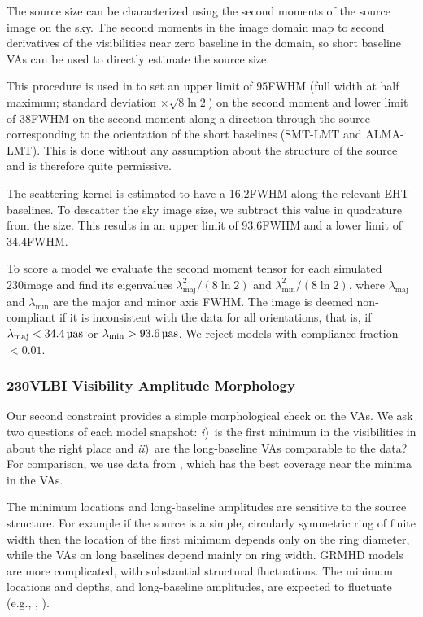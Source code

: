 The source size can be characterized using the second moments of the
source image on the sky.
The second moments in the image domain map to second derivatives of
the visibilities near zero baseline in the \uv domain, so short
baseline VAs can be used to directly estimate the source size.

This procedure is used in  to set an upper limit
of 95\uas FWHM (full width at half maximum; standard deviation
$\times \sqrt{8\ln{2}}$) on the second moment and lower limit of
38\uas FWHM on the second moment along a direction
through the source corresponding to the orientation of the short
baselines (SMT-LMT and ALMA-LMT).
This is done without any assumption about the structure of the source
and is therefore quite permissive.

The scattering kernel is estimated to have a 16.2\uas FWHM along the
relevant EHT baselines.
To descatter the sky image size, we subtract this value in quadrature
from the size.
This results in an upper limit of 93.6\uas FWHM and a lower limit of
34.4\uas FWHM.

To score a model we evaluate the second moment tensor for each
simulated 230\GHz image and find its eigenvalues
$\lambda_\mathrm{maj}^2/(8\ln 2)$ and $\lambda_\mathrm{min}^2/(8\ln
2)$, where $\lambda_\mathrm{maj}$ and $\lambda_\mathrm{min}$ are the
major and minor axis FWHM.
The image is deemed non-compliant if it is inconsistent with the data
for all orientations, that is, if $\lambda_\mathrm{maj} < 34.4\uas$ or
$\lambda_\mathrm{min} > 93.6\uas$.
We reject models with compliance fraction $< 0.01$.

\subsubsection{230\GHz VLBI Visibility Amplitude Morphology}

Our second constraint provides a simple morphological check on the
VAs.
We ask two questions of each model snapshot:
\emph{i})~is the first minimum in the visibilities in about the right
place and
\emph{ii})~are the long-baseline VAs comparable to the data?
For comparison, we use data from \aprilvii, which has the best \uv
coverage near the minima in the VAs.

The minimum locations and long-baseline amplitudes are sensitive to
the source structure.
For example if the source is a simple, circularly symmetric ring of
finite width then the location of the first minimum depends only on
the ring diameter, while the VAs on long baselines depend mainly on
ring width.
GRMHD models are more complicated, with substantial structural
fluctuations.
The minimum locations and depths, and long-baseline amplitudes, are
expected to fluctuate (e.g., \citealt{2018ApJ...856..163M},
).


